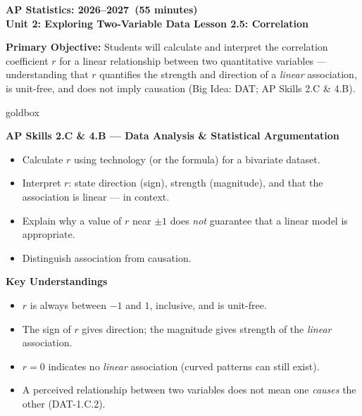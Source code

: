 \documentclass[10pt]{article}
\newcommand{\CourseName}{AP Statistics}
\newcommand{\SchoolYear}{2026--2027}
\newcommand{\MeetingLength}{55 minutes}
\newcommand{\UnitNumberName}{Unit 2: Exploring Two-Variable Data \quad}
\newcommand{\LessonNumberName}{Lesson 2.5: Correlation}
\begin{document}
\begin{center}
    {\Large\bfseries \CourseName: \SchoolYear\ (\MeetingLength) \\
    {\small\bfseries \UnitNumberName \LessonNumberName}}
\end{center}

\begin{tcolorbox}[colback=sky,colframe=navy,boxrule=0.9pt,arc=2mm,
    left=2mm,right=2mm,top=1.5mm,bottom=1.5mm]
    \textbf{Primary Objective:} Students will calculate and interpret the correlation
    coefficient $r$ for a linear relationship between two quantitative variables ---
    understanding that $r$ quantifies the strength and direction of a \emph{linear}
    association, is unit-free, and does not imply causation (Big Idea: DAT; AP Skills 2.C \& 4.B).
\end{tcolorbox}

\begin{skillbox}{goldbox}
\begin{minipage}[t]{0.48\linewidth}
    \textbf{AP Skills 2.C \& 4.B --- Data Analysis \& Statistical Argumentation}
    \begin{itemize}
        \item Calculate $r$ using technology (or the formula) for a bivariate dataset.
        \item Interpret $r$: state direction (sign), strength (magnitude), and that the
              association is linear --- in context.
        \item Explain why a value of $r$ near $\pm 1$ does \emph{not} guarantee that a
              linear model is appropriate.
        \item Distinguish association from causation.
    \end{itemize}
\end{minipage}
\hfill
\begin{minipage}[t]{0.48\linewidth}
    \textbf{Key Understandings}
    \begin{itemize}
        \item $r$ is always between $-1$ and $1$, inclusive, and is unit-free.
        \item The sign of $r$ gives direction; the magnitude gives strength of the
              \emph{linear} association.
        \item $r = 0$ indicates no \emph{linear} association (curved patterns can still exist).
        \item A perceived relationship between two variables does not mean one \emph{causes}
              the other (DAT-1.C.2).
    \end{itemize}
\end{minipage}
\end{skillbox}
\end{document}
